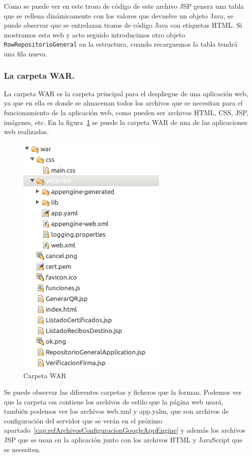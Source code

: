 \begin{itemize}
Como se puede ver en este trozo de código de este archivo JSP genera una tabla que se rellena dinámicamente con los valores que devuelve un objeto Java, se puede observar que se entrelazan trozos de código Java con etiquetas HTML. Si mostramos esta web y acto seguido introducimos otro objeto \lstinline{RowRepositorioGeneral} en la estructura, cuando recarguemos la tabla tendrá una fila nueva.

\subsubsection{La carpeta WAR.}

La carpeta WAR es la carpeta principal para el despliegue de una aplicación web, ya que en ella es donde se almacenan todos los archivos que se necesitan para el funcionamiento de la aplicación web, como pueden ser archivos HTML, CSS, JSP, imágenes, etc. En la figura~\ref{fig:carpetawar} se puede la carpeta WAR de una de las aplicaciones web realizadas.

\begin{figure}
  \centering
    \includegraphics{./GoogleAppEngine/imagenes/carpetawar.png}
  \caption{Carpeta WAR}
  \label{fig:carpetawar}
\end{figure}

Se puede observar las diferentes carpetas y ficheros que la forman. Podemos ver que la carpeta css contiene los archivos de estilo que la página web usará, también podemos ver los archivos web.xml y app.yalm, que son archivos de configuración del servidor que se verán en el próximo apartado~\ref{cap:refArchivosConfiguracionGoogleAppEngine} y además los archivos JSP que se usan en la aplicación junto con los archivos HTML y JavaScript que se necesiten.


\end{itemize}
